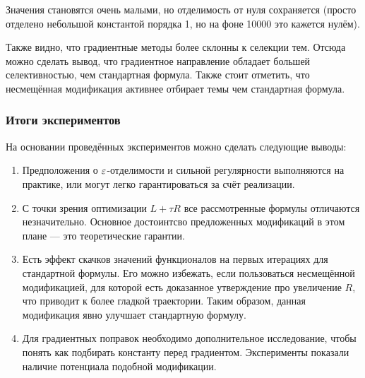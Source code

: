 \documentclass[12pt, twoside]{article}
\begin{document}
Значения становятся очень малыми, но отделимость от нуля сохраняется (просто отделено небольшой константой порядка 1, но на фоне 10000 это кажется нулём). 

Также видно, что градиентные методы более склонны к селекции тем. Отсюда можно сделать вывод, что градиентное направление обладает большей селективностью, чем стандартная формула. Также стоит отметить, что несмещённая модификация активнее отбирает темы чем стандартная формула.
\subsubsection{Итоги экспериментов}
На основании проведённых экспериментов можно сделать следующие выводы:
\begin{enumerate}
\item Предположения о $\varepsilon$-отделимости и сильной регулярности выполняются на практике, или могут легко гарантироваться за счёт реализации.
\item С точки зрения оптимизации $L + \tau R$ все рассмотренные формулы отличаются незначительно. Основное достоинтсво предложенных модификаций в этом плане --- это теоретические гарантии.
\item Есть эффект скачков значений функционалов на первых итерациях для стандартной формулы. Его можно избежать, если пользоваться несмещённой модификацией, для которой есть доказанное утверждение про увеличение $R$, что приводит к более гладкой траектории. Таким образом, данная модификация явно улучшает стандартную формулу.
\item Для градиентных поправок необходимо дополнительное исследование, чтобы понять как подбирать константу перед градиентом. Эксперименты показали наличие потенциала подобной модификации.
\end{enumerate}
\end{document}
